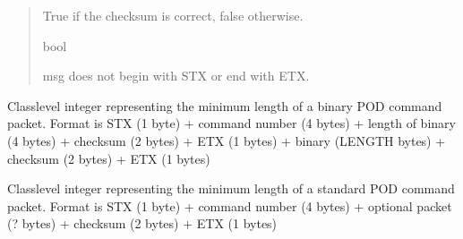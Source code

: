 \documentclass[letterpaper,10pt,english]{sphinxmanual}
\begin{document}
\begin{fulllineitems}
\begin{fulllineitems}
\begin{quote}
\begin{description}
\sphinxAtStartPar
True if the checksum is correct, false otherwise.

\sphinxAtStartPar
bool

\sphinxAtStartPar
{} \textendash{} msg does not begin with STX or end with ETX.

\end{description}\end{quote}

\end{fulllineitems}


\begin{fulllineitems}
\label{\detokenize{BasicPodProtocol:BasicPodProtocol.POD_Basics.__MINBINARYLENGTH}}
\pysigstartsignatures
{}
\pysigstopsignatures
\sphinxAtStartPar
Class\sphinxhyphen{}level integer representing the minimum length of a binary POD     command packet. Format is STX (1 byte) + command number (4 bytes) + length     of binary (4 bytes) + checksum (2 bytes) + ETX (1 bytes) + binary (LENGTH     bytes) + checksum (2 bytes) + ETX (1 bytes)

\end{fulllineitems}


\begin{fulllineitems}
\label{\detokenize{BasicPodProtocol:BasicPodProtocol.POD_Basics.__MINSTANDARDLENGTH}}
\pysigstartsignatures
{}
\pysigstopsignatures
\sphinxAtStartPar
Class\sphinxhyphen{}level integer representing the minimum length of a standard     POD command packet. Format is STX (1 byte) + command number (4 bytes)     + optional packet  (? bytes) + checksum (2 bytes) + ETX (1 bytes)


\end{fulllineitems}
\end{fulllineitems}
\end{document}
